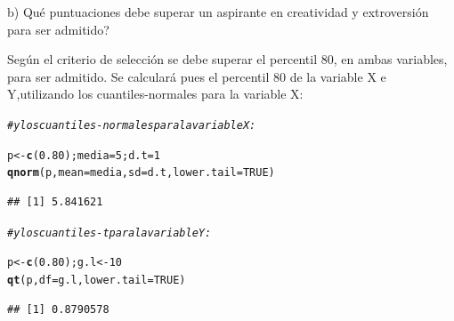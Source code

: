 \documentclass[12pt,letterpaper]{article}\usepackage[]{graphicx}\usepackage[]{color}
\makeatletter
\newcommand{\hlnum}[1]{\textcolor[rgb]{0.686,0.059,0.569}{#1}}%
\newcommand{\hlcom}[1]{\textcolor[rgb]{0.678,0.584,0.686}{\textit{#1}}}%
\newcommand{\hlstd}[1]{\textcolor[rgb]{0.345,0.345,0.345}{#1}}%
\newcommand{\hlkwb}[1]{\textcolor[rgb]{0.69,0.353,0.396}{#1}}%
\newcommand{\hlkwc}[1]{\textcolor[rgb]{0.333,0.667,0.333}{#1}}%
\newcommand{\hlkwd}[1]{\textcolor[rgb]{0.737,0.353,0.396}{\textbf{#1}}}%
\newenvironment{kframe}{%
 \def\at@end@of@kframe{}%
 \ifinner\ifhmode%
  \def\at@end@of@kframe{\end{minipage}}%
  \begin{minipage}{\columnwidth}%
 \fi\fi%
 \def\FrameCommand##1{\hskip\@totalleftmargin \hskip-\fboxsep
 \colorbox{shadecolor}{##1}\hskip-\fboxsep
     \hskip-\linewidth \hskip-\@totalleftmargin \hskip\columnwidth}%
 \MakeFramed {\advance\hsize-\width
   \@totalleftmargin\z@ \linewidth\hsize
   \@setminipage}}%
 {\par\unskip\endMakeFramed%
 \at@end@of@kframe}
\newenvironment{knitrout}{}{} %
\makeatother
\begin{document}
\begin{description}
  \item b) \¿Qu\'e puntuaciones debe superar un aspirante en creatividad y extroversi\'on para ser admitido?
  
Seg\'un el criterio de selecci\'on se debe superar el percentil 80, en ambas variables, para ser admitido. Se calcular\'a pues el percentil 80 de la variable X e Y,utilizando los cuantiles-normales para la variable X: 
\begin{knitrout}
\color{fgcolor}\begin{kframe}
\begin{alltt}
\hlcom{# y los cuantiles-normales para la variable X:}

\hlstd{p} \hlkwb{<-} \hlkwd{c}\hlstd{(}\hlnum{0.80}\hlstd{); media}\hlkwb{=}\hlnum{5}\hlstd{; d.t}\hlkwb{=}\hlnum{1}
\hlkwd{qnorm}\hlstd{(p,} \hlkwc{mean}\hlstd{=media,} \hlkwc{sd}\hlstd{=d.t,} \hlkwc{lower.tail}\hlstd{=}\hlnum{TRUE}\hlstd{)}
\end{alltt}
\begin{verbatim}
## [1] 5.841621
\end{verbatim}
\end{kframe}
\end{knitrout}

\begin{knitrout}
\color{fgcolor}\begin{kframe}
\begin{alltt}
\hlcom{#y los cuantiles-t para la variable Y:}

\hlstd{p} \hlkwb{<-} \hlkwd{c}\hlstd{(}\hlnum{0.80}\hlstd{); g.l} \hlkwb{<-} \hlnum{10}
\hlkwd{qt}\hlstd{(p,} \hlkwc{df}\hlstd{=g.l,} \hlkwc{lower.tail}\hlstd{=}\hlnum{TRUE}\hlstd{)}
\end{alltt}
\begin{verbatim}
## [1] 0.8790578
\end{verbatim}
\end{kframe}
\end{knitrout}
\end{description}
\end{document}
